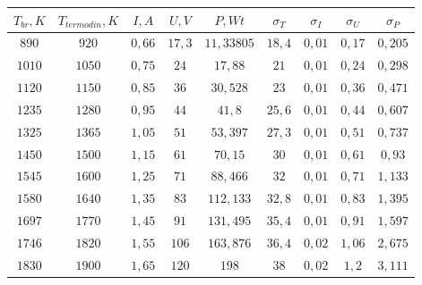 \begin{tabular}{| c | c | c | c | c | c | c | c | c |}
\hline
$T_{br}, K$ & $T_{termodin}, K$ & $I, A$ & $U, V$ & $P, Wt$ & $\sigma_T$ & $\sigma_I$ & $\sigma_U$ & $\sigma_P$\\
\hline
$890$ & $920$ & $0,66$ & $17,3$ & $11,33805$ & $18,4$ & $0,01$ & $0,17$ & $0,205$\\
\hline
$1010$ & $1050$ & $0,75$ & $24$ & $17,88$ & $21$ & $0,01$ & $0,24$ & $0,298$\\
\hline
$1120$ & $1150$ & $0,85$ & $36$ & $30,528$ & $23$ & $0,01$ & $0,36$ & $0,471$\\
\hline
$1235$ & $1280$ & $0,95$ & $44$ & $41,8$ & $25,6$ & $0,01$ & $0,44$ & $0,607$\\
\hline
$1325$ & $1365$ & $1,05$ & $51$ & $53,397$ & $27,3$ & $0,01$ & $0,51$ & $0,737$\\
\hline
$1450$ & $1500$ & $1,15$ & $61$ & $70,15$ & $30$ & $0,01$ & $0,61$ & $0,93$\\
\hline
$1545$ & $1600$ & $1,25$ & $71$ & $88,466$ & $32$ & $0,01$ & $0,71$ & $1,133$\\
\hline
$1580$ & $1640$ & $1,35$ & $83$ & $112,133$ & $32,8$ & $0,01$ & $0,83$ & $1,395$\\
\hline
$1697$ & $1770$ & $1,45$ & $91$ & $131,495$ & $35,4$ & $0,01$ & $0,91$ & $1,597$\\
\hline
$1746$ & $1820$ & $1,55$ & $106$ & $163,876$ & $36,4$ & $0,02$ & $1,06$ & $2,675$\\
\hline
$1830$ & $1900$ & $1,65$ & $120$ & $198$ & $38$ & $0,02$ & $1,2$ & $3,111$\\
\hline
\end{tabular}
